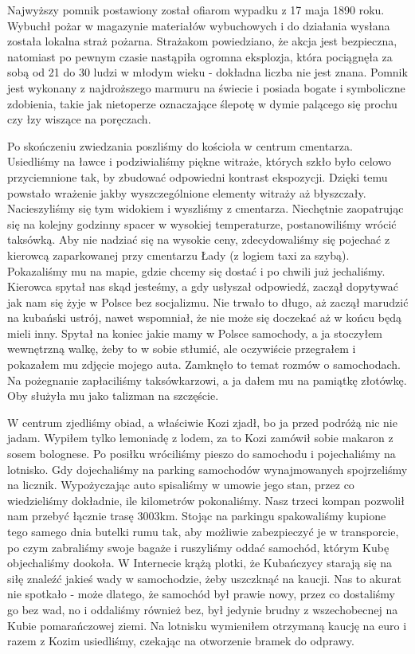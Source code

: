 Najwyższy pomnik postawiony został ofiarom wypadku z 17 maja 1890 roku.
Wybuchł pożar w magazynie materiałów wybuchowych i do działania wysłana została lokalna straż pożarna.
Strażakom powiedziano, że akcja jest bezpieczna, natomiast po pewnym czasie nastąpiła ogromna eksplozja, która pociągnęła za sobą od 21 do 30 ludzi w młodym wieku - dokładna liczba nie jest znana.
Pomnik jest wykonany z najdroższego marmuru na świecie i posiada bogate i symboliczne zdobienia, takie jak nietoperze oznaczające ślepotę w dymie palącego się prochu czy łzy wiszące na poręczach.
\par Po skończeniu zwiedzania poszliśmy do kościoła w centrum cmentarza.
Usiedliśmy na ławce i podziwialiśmy piękne witraże, których szkło było celowo przyciemnione tak, by zbudować odpowiedni kontrast ekspozycji.
Dzięki temu powstało wrażenie jakby wyszczególnione elementy witraży aż błyszczały.
Nacieszyliśmy się tym widokiem i wyszliśmy z cmentarza.
Niechętnie zaopatrując się na kolejny godzinny spacer w wysokiej temperaturze, postanowiliśmy wrócić taksówką.
Aby nie nadziać się na wysokie ceny, zdecydowaliśmy się pojechać z kierowcą zaparkowanej przy cmentarzu Łady (z logiem taxi za szybą).
Pokazaliśmy mu na mapie, gdzie chcemy się dostać i po chwili już jechaliśmy.
Kierowca spytał nas skąd jesteśmy, a gdy usłyszał odpowiedź, zaczął dopytywać jak nam się żyje w Polsce bez socjalizmu.
Nie trwało to długo, aż zaczął marudzić na kubański ustrój, nawet wspomniał, że nie może się doczekać aż w końcu będą mieli inny.
Spytał na koniec jakie mamy w Polsce samochody, a ja stoczyłem wewnętrzną walkę, żeby to w sobie stłumić, ale oczywiście przegrałem i pokazałem mu zdjęcie mojego auta.
Zamknęło to temat rozmów o samochodach.
Na pożegnanie zapłaciliśmy taksówkarzowi, a ja dałem mu na pamiątkę złotówkę.
Oby służyła mu jako talizman na szczęście.
\par W centrum zjedliśmy obiad, a właściwie Kozi zjadł, bo ja przed podróżą nic nie jadam.
Wypiłem tylko lemoniadę z lodem, za to Kozi zamówił sobie makaron z sosem bolognese.
Po posiłku wróciliśmy pieszo do samochodu i pojechaliśmy na lotnisko.
Gdy dojechaliśmy na parking samochodów wynajmowanych spojrzeliśmy na licznik. Wypożyczając auto spisaliśmy w umowie jego stan, przez co wiedzieliśmy dokładnie, ile kilometrów pokonaliśmy. Nasz trzeci kompan pozwolił nam przebyć łącznie trasę 3003km.
Stojąc na parkingu spakowaliśmy kupione tego samego dnia butelki rumu tak, aby możliwie zabezpieczyć je w transporcie, po czym zabraliśmy swoje bagaże i ruszyliśmy oddać samochód, którym Kubę objechaliśmy dookoła.
W Internecie krążą plotki, że Kubańczycy starają się na siłę znaleźć jakieś wady w samochodzie, żeby uszczknąć na kaucji.
Nas to akurat nie spotkało - może dlatego, że samochód był prawie nowy, przez co dostaliśmy go bez wad, no i oddaliśmy również bez, był jedynie brudny z wszechobecnej na Kubie pomarańczowej ziemi.
Na lotnisku wymieniłem otrzymaną kaucję na euro i razem z Kozim usiedliśmy, czekając na otworzenie bramek do odprawy.